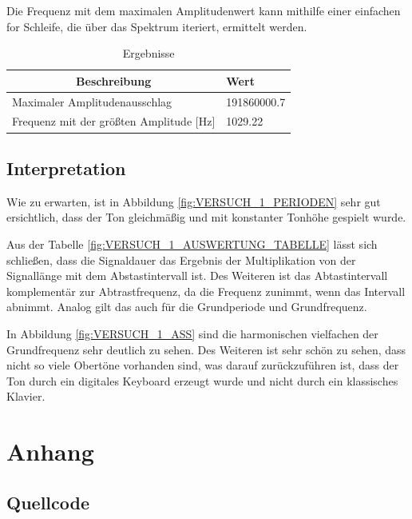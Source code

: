 \documentclass[12pt, oneside, a4paper, \docLanguage]{report}
\begin{document}
Die Frequenz mit dem maximalen Amplitudenwert kann mithilfe einer einfachen for Schleife, die über das Spektrum iteriert, ermittelt werden.

\begin{table}[H]
\center
\begin{tabular}{|l|l|}
\hline
\multicolumn{1}{|c|}{\textbf{Beschreibung}}   & \textbf{Wert} \\ \hline
Maximaler Amplitudenausschlag                         & 191860000.7          \\ \hline
Frequenz mit der größten Amplitude {[}Hz{]}                        & 1029.22        \\ \hline
\end{tabular}
\caption{Ergebnisse}
\label{fig:VERSUCH_1_MAX}
\end{table}
\newpage
\section{Interpretation}
\label{chap:VERSUCH_1_INTERPRETATION}
Wie zu erwarten, ist in Abbildung \ref{fig:VERSUCH_1_PERIODEN} sehr gut ersichtlich, dass der Ton gleichmäßig und mit konstanter Tonhöhe gespielt wurde. 

Aus der Tabelle \ref{fig:VERSUCH_1_AUSWERTUNG_TABELLE} lässt sich schließen, dass die Signaldauer das Ergebnis der Multiplikation von der Signallänge mit dem Abstastintervall ist. Des Weiteren ist das Abtastintervall komplementär zur Abtrastfrequenz, da die Frequenz zunimmt, wenn das Intervall abnimmt. Analog gilt das auch für die Grundperiode und Grundfrequenz.

In Abbildung \ref{fig:VERSUCH_1_ASS} sind die harmonischen vielfachen der Grundfrequenz sehr deutlich zu sehen.
Des Weiteren ist sehr schön zu sehen, dass nicht so viele Obertöne vorhanden sind, was darauf zurückzuführen ist, dass der Ton durch ein digitales Keyboard erzeugt wurde und nicht durch ein klassisches Klavier.

%
%
\renewcommand\thesection{A.\arabic{section}}
\renewcommand\thesubsection{\thesection.\arabic{subsection}}

\chapter*{Anhang}
\label{chap:APPENDIX}
\addtocounter{chapter}{1}
\setcounter{section}{0}

\section{Quellcode}
\label{chap:APPENDIX_SOURCECODE}
\end{document}
